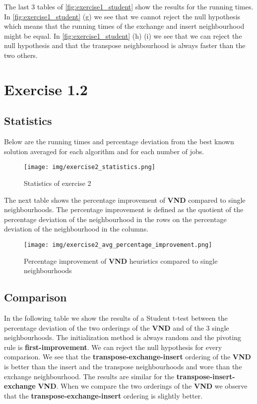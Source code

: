 \documentclass[a4paper,10pt]{article}
\begin{document}
The last 3 tables of \ref{fig:exercise1_student} show the results for the running times. In \ref{fig:exercise1_student} (g) we see that we cannot reject the null hypothesis which means that the running times of the exchange and insert neighbourhood might be equal. In \ref{fig:exercise1_student} (h) (i) we see that we can reject the null hypothesis and that the transpose neighbourhood is always faster than the two others.

\section{Exercise 1.2}

\subsection{Statistics}

Below are the running times and percentage deviation from the best known solution averaged for each algorithm and for each number of jobs.

\begin{figure}[H]
	\centering
	\caption{Statistics of exercise 2}
	\texttt{[image: img/exercise2\_statistics.png]}
\end{figure}


The next table shows the percentage improvement of \textbf{VND} compared to single neighbourhoods. The percentage improvement is defined as the quotient of the percentage deviation of the neighbourhood in the rows on the percentage deviation of the neighbourhood in the columns.
\begin{figure}[H]
	\centering
	\caption{Percentage improvement of \textbf{VND} heuristics compared to single neighbourhoods}
	\texttt{[image: img/exercise2\_avg\_percentage\_improvement.png]}
\end{figure}

\subsection{Comparison}

In the following table we show the results of a Student t-test between the percentage deviation of the two orderings of the \textbf{VND} and of the 3 single neighbourhoods. The initialization method is always random and the pivoting rule is \textbf{first-improvement}. We can reject the null hypothesis for every comparison. We see that the \textbf{transpose-exchange-insert} ordering of the \textbf{VND} is better than the insert and the transpose neighbourhoods and wore than the exchange neighbourhood. The results are similar for the \textbf{transpose-insert-exchange} \textbf{VND}. When we compare the two orderings of the \textbf{VND} we observe that the \textbf{transpose-exchange-insert} ordering is slightly better. \\
\end{document}
